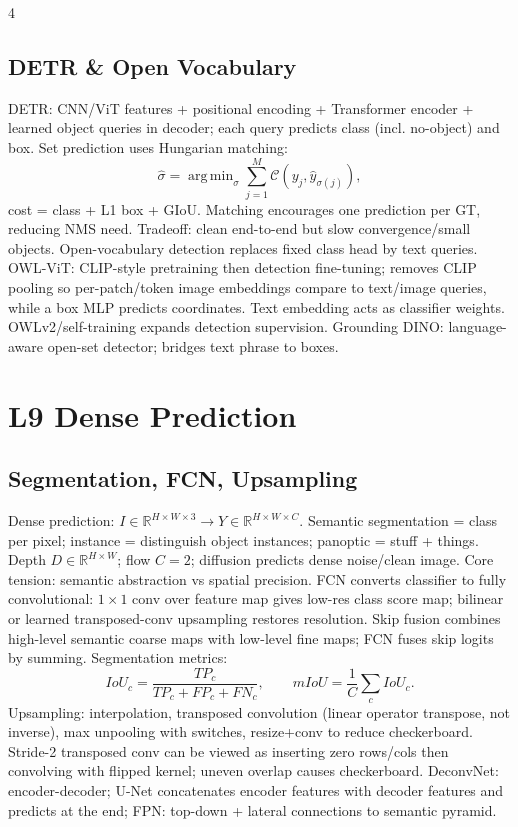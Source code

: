 \documentclass[8pt,a4paper,landscape]{extarticle}
\newcommand{\R}{\mathbb{R}}
\DeclareMathOperator*{\argmin}{arg\,min}
\begin{document}
\begin{multicols*}{4}
\subsection{DETR \& Open Vocabulary}
DETR: CNN/ViT features + positional encoding + Transformer encoder + learned object queries in decoder; each query predicts class (incl. no-object) and box. Set prediction uses Hungarian matching:
\[
\hat\sigma=\argmin_\sigma\sum_{j=1}^M \mathcal C(y_j,\hat y_{\sigma(j)}),
\]
cost = class + L1 box + GIoU. Matching encourages one prediction per GT, reducing NMS need. Tradeoff: clean end-to-end but slow convergence/small objects.
Open-vocabulary detection replaces fixed class head by text queries. OWL-ViT: CLIP-style pretraining then detection fine-tuning; removes CLIP pooling so per-patch/token image embeddings compare to text/image queries, while a box MLP predicts coordinates. Text embedding acts as classifier weights. OWLv2/self-training expands detection supervision. Grounding DINO: language-aware open-set detector; bridges text phrase to boxes.

\section{L9 Dense Prediction}
\subsection{Segmentation, FCN, Upsampling}
Dense prediction: $I\in\R^{H\times W\times3}\to Y\in\R^{H\times W\times C}$. Semantic segmentation = class per pixel; instance = distinguish object instances; panoptic = stuff + things. Depth $D\in\R^{H\times W}$; flow $C=2$; diffusion predicts dense noise/clean image. Core tension: semantic abstraction vs spatial precision.
FCN converts classifier to fully convolutional: $1\times1$ conv over feature map gives low-res class score map; bilinear or learned transposed-conv upsampling restores resolution. Skip fusion combines high-level semantic coarse maps with low-level fine maps; FCN fuses skip logits by summing. Segmentation metrics:
\[
IoU_c=\frac{TP_c}{TP_c+FP_c+FN_c},\qquad mIoU=\frac1C\sum_cIoU_c.
\]
Upsampling: interpolation, transposed convolution (linear operator transpose, not inverse), max unpooling with switches, resize+conv to reduce checkerboard. Stride-2 transposed conv can be viewed as inserting zero rows/cols then convolving with flipped kernel; uneven overlap causes checkerboard. DeconvNet: encoder-decoder; U-Net concatenates encoder features with decoder features and predicts at the end; FPN: top-down + lateral connections to semantic pyramid.


\end{multicols*}
\end{document}
